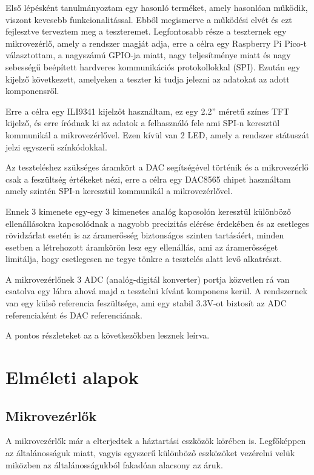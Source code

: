 Első lépésként tanulmányoztam egy hasonló terméket, amely hasonlóan működik, 
viszont kevesebb funkcionalitással. Ebből megismerve a működési elvét és ezt 
fejlesztve terveztem meg a teszteremet. Legfontosabb része a teszternek egy 
mikrovezérlő, amely a rendszer magját adja, erre a célra egy Raspberry Pi Pico-t 
választottam, a nagyszámú GPIO-ja miatt, nagy teljesítménye miatt és nagy 
sebességű beépített hardveres kommunikációs protokollokkal (SPI). Ezután egy 
kijelző következett, amelyeken a teszter ki tudja jelezni az adatokat az adott 
komponensről. 

Erre a célra egy ILI9341 kijelzőt használtam, ez egy 2.2” méretű 
színes TFT kijelző, és erre íródnak ki az adatok a felhasználó fele ami SPI-n 
keresztül kommunikál a mikrovezérlővel. Ezen kívül  van 2 LED, amely a rendszer 
státuszát jelzi egyszerű színkódokkal. 

Az teszteléshez  szükséges áramkört a DAC segítségével történik és a mikrovezérlő 
csak a feszültség értékeket nézi, erre a célra egy DAC8565 chipet használtam amely 
szintén SPI-n 
keresztül kommunikál a mikrovezérlővel. 

Ennek 3 kimenete egy-egy 3 kimenetes 
analóg kapcsolón keresztül különböző ellenállásokra kapcsolódnak a nagyobb 
precizitás elérése érdekében és az esetleges rövidzárlat esetén is az áramerősség 
biztonságos szinten tartásáért, minden esetben a létrehozott áramkörön lesz egy 
ellenállás, ami az áramerősséget limitálja, hogy esetlegesen ne tegye tönkre a 
tesztelés alatt levő alkatrészt. 

A mikrovezérlőnek 3 ADC (analóg-digitál 
konverter) portja közvetlen rá van csatolva egy lábra ahová majd a tesztelni kívánt 
komponens kerül. A rendszernek van egy külső referencia feszültsége, ami egy 
stabil 3.3V-ot biztosít az ADC referenciaként és DAC referenciának.

A pontos részleteket az a következőkben lesznek leírva.

\section{Elméleti alapok}

\subsection{Mikrovezérlők}

A mikrovezérlők már a elterjedtek a háztartási eszközök körében is. Legfőképpen az
általánosságuk miatt, vagyis egyszerű különböző eszközöket vezérelni velük miközben 
az általánosságukból fakadóan alacsony az áruk.

